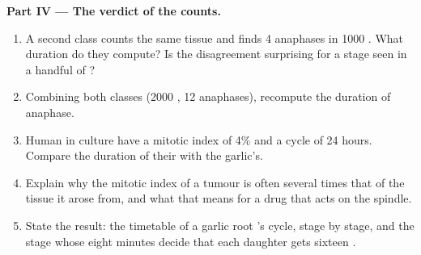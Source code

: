 \begin{problem}
\medskip
\noindent\textbf{Part IV --- The verdict of the counts.}
\begin{enumerate}[resume]
  \item A second class counts the same tissue and finds 4 anaphases in
        1000 . What duration do they compute? Is the disagreement
        surprising for a stage seen in a handful of ?
  \item Combining both classes (2000 , 12 anaphases), recompute
        the duration of anaphase.
  \item Human  in culture have a mitotic index of 4\% and a cycle
        of 24 hours. Compare the duration of their  with the
        garlic's.
  \item Explain why the mitotic index of a tumour is often several
        times that of the tissue it arose from, and what that means
        for a drug that acts on the spindle.
  \item State the result: the timetable of a garlic root 's cycle,
        stage by stage, and the stage whose eight minutes decide that
        each daughter gets sixteen .
\end{enumerate}
\end{problem}
